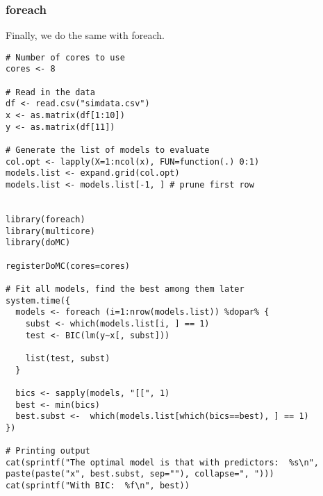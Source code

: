 \subsubsection{foreach}
Finally, we do the same with foreach.
\begin{lstlisting}[language=rr]
# Number of cores to use
cores <- 8

# Read in the data
df <- read.csv("simdata.csv")
x <- as.matrix(df[1:10])
y <- as.matrix(df[11])

# Generate the list of models to evaluate
col.opt <- lapply(X=1:ncol(x), FUN=function(.) 0:1)
models.list <- expand.grid(col.opt)
models.list <- models.list[-1, ] # prune first row


library(foreach)
library(multicore)
library(doMC)

registerDoMC(cores=cores)

# Fit all models, find the best among them later
system.time({
  models <- foreach (i=1:nrow(models.list)) %dopar% {
    subst <- which(models.list[i, ] == 1)
    test <- BIC(lm(y~x[, subst]))

    list(test, subst)
  }

  bics <- sapply(models, "[[", 1)
  best <- min(bics)
  best.subst <-  which(models.list[which(bics==best), ] == 1)
})

# Printing output
cat(sprintf("The optimal model is that with predictors:  %s\n", paste(paste("x", best.subst, sep=""), collapse=", ")))
cat(sprintf("With BIC:  %f\n", best))
\end{lstlisting}
